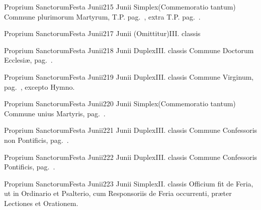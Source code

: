 \documentclass[nocturnale-romanum.tex]{subfiles}
\begin{document}
	{Proprium Sanctorum}{Festa Junii}{2}{15 Junii}
	{Simplex}{(Commemoratio tantum)}
	{Commune plurimorum Martyrum, T.P. pag.\ \pageref{M-MRTP}, extra T.P. pag.\ \pageref{M-PMEX}.}
	{}

	{Proprium Sanctorum}{Festa Junii}{2}{17 Junii}
	{(Omittitur)}{III. classis}
	{}
	{}

	{Proprium Sanctorum}{Festa Junii}{2}{18 Junii}
	{Duplex}{III. classis}
	{Commune Doctorum Ecclesiæ, pag.\ \pageref{M-CODO}.}
	{}

	{Proprium Sanctorum}{Festa Junii}{2}{19 Junii}
	{Duplex}{III. classis}
	{Commune Virginum, pag.\ \pageref{M-MU}, excepto Hymno.}
	{}

	{Proprium Sanctorum}{Festa Junii}{2}{20 Junii}
	{Simplex}{(Commemoratio tantum)}
	{Commune unius Martyris, pag.\ \pageref{M-UMEX}.}
	{}

	{Proprium Sanctorum}{Festa Junii}{2}{21 Junii}
	{Duplex}{III. classis}
	{Commune Confessoris non Pontificis, pag.\ \pageref{M-CONP}.}
	{}

	{Proprium Sanctorum}{Festa Junii}{2}{22 Junii}
	{Duplex}{III. classis}
	{Commune Confessoris Pontificis, pag.\ \pageref{M-COPO}.}
	{}

	{Proprium Sanctorum}{Festa Junii}{2}{23 Junii}
	{Simplex}{II. classis}
	{Officium fit de Feria, ut in Ordinario et Psalterio, cum Responsoriis de Feria occurrenti, præter Lectiones et Orationem.}
	{}
\end{document}
